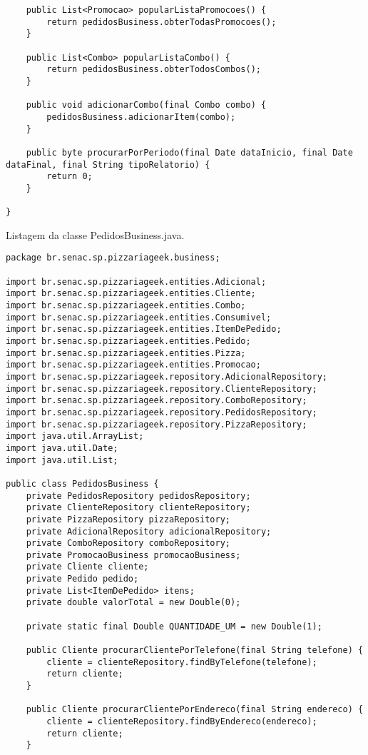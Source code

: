 \begin{lstlisting}
    public List<Promocao> popularListaPromocoes() {
        return pedidosBusiness.obterTodasPromocoes();
    }

    public List<Combo> popularListaCombo() {
        return pedidosBusiness.obterTodosCombos();
    }

    public void adicionarCombo(final Combo combo) {
        pedidosBusiness.adicionarItem(combo);
    }

    public byte procurarPorPeriodo(final Date dataInicio, final Date dataFinal, final String tipoRelatorio) {
        return 0;
    }

}
\end{lstlisting}

Listagem da classe PedidosBusiness.java.
\newline
\begin{lstlisting}
package br.senac.sp.pizzariageek.business;

import br.senac.sp.pizzariageek.entities.Adicional;
import br.senac.sp.pizzariageek.entities.Cliente;
import br.senac.sp.pizzariageek.entities.Combo;
import br.senac.sp.pizzariageek.entities.Consumivel;
import br.senac.sp.pizzariageek.entities.ItemDePedido;
import br.senac.sp.pizzariageek.entities.Pedido;
import br.senac.sp.pizzariageek.entities.Pizza;
import br.senac.sp.pizzariageek.entities.Promocao;
import br.senac.sp.pizzariageek.repository.AdicionalRepository;
import br.senac.sp.pizzariageek.repository.ClienteRepository;
import br.senac.sp.pizzariageek.repository.ComboRepository;
import br.senac.sp.pizzariageek.repository.PedidosRepository;
import br.senac.sp.pizzariageek.repository.PizzaRepository;
import java.util.ArrayList;
import java.util.Date;
import java.util.List;

public class PedidosBusiness {
    private PedidosRepository pedidosRepository;
    private ClienteRepository clienteRepository;
    private PizzaRepository pizzaRepository;
    private AdicionalRepository adicionalRepository;
    private ComboRepository comboRepository;
    private PromocaoBusiness promocaoBusiness;
    private Cliente cliente;
    private Pedido pedido;
    private List<ItemDePedido> itens;
    private double valorTotal = new Double(0);
    
    private static final Double QUANTIDADE_UM = new Double(1);

    public Cliente procurarClientePorTelefone(final String telefone) {
        cliente = clienteRepository.findByTelefone(telefone);
        return cliente;
    }

    public Cliente procurarClientePorEndereco(final String endereco) {
        cliente = clienteRepository.findByEndereco(endereco);
        return cliente;
    }


\end{lstlisting}
